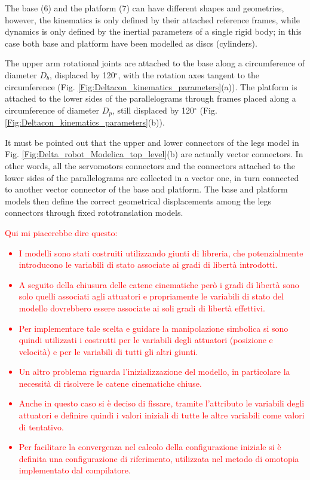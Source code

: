 \documentclass[]{interact}
\theoremstyle{plain}%
\theoremstyle{definition}
\theoremstyle{remark}
\begin{document}
The base (6) and the platform (7) can have different shapes and geometries, however, the kinematics is only defined by their attached reference frames, while dynamics is only defined by the inertial parameters of a single rigid body; in this case both base and platform have been modelled as discs (cylinders).

The upper arm rotational joints are attached to the base along a circumference of diameter $D_b$, displaced by 120$^\circ$, with the rotation axes tangent to the circumference (Fig. \ref{Fig:Deltacon_kinematics_parameters}(a)). The platform is attached to the lower sides of the parallelograms through frames placed along a circumference of diameter $D_p$, still displaced by 120$^\circ$ (Fig. \ref{Fig:Deltacon_kinematics_parameters}(b)).

It must be pointed out that the upper and lower connectors of the legs model in Fig. \ref{Fig:Delta_robot_Modelica_top_level}(b) are actually vector connectors. In other words, all the servomotors connectors and the connectors attached to the lower sides of the parallelograms are collected in a vector one, in turn connected to another vector connector of the base and platform. The base and platform models then define the correct geometrical displacements among the legs connectors through fixed rototranslation models.

\textcolor{red}{
Qui mi piacerebbe dire questo:
\begin{itemize}
  \item I modelli sono stati costruiti utilizzando giunti di libreria, che potenzialmente introducono le variabili di stato associate ai gradi di libert\`{a} introdotti.
  \item A seguito della chiusura delle catene cinematiche per\`{o} i gradi di libert\`{a} sono solo quelli associati agli attuatori e propriamente le variabili di stato del modello dovrebbero essere associate ai soli gradi di libert\`{a} effettivi.
  \item Per implementare tale scelta e guidare la manipolazione simbolica si sono quindi utilizzati i costrutti  per le variabili degli attuatori (posizione e velocit\`{a}) e  per le variabili di tutti gli altri giunti.
  \item Un altro problema riguarda l'inizializzazione del modello, in particolare la necessit\`{a} di risolvere le catene cinematiche chiuse.
  \item Anche in questo caso si è deciso di fissare, tramite l'attributo  le variabili degli attuatori e definire quindi i valori iniziali di tutte le altre variabili come valori di tentativo.
  \item Per facilitare la convergenza nel calcolo della configurazione iniziale si \`{e} definita una configurazione di riferimento, utilizzata nel metodo di omotopia implementato dal compilatore.
\end{itemize}
}
\end{document}
